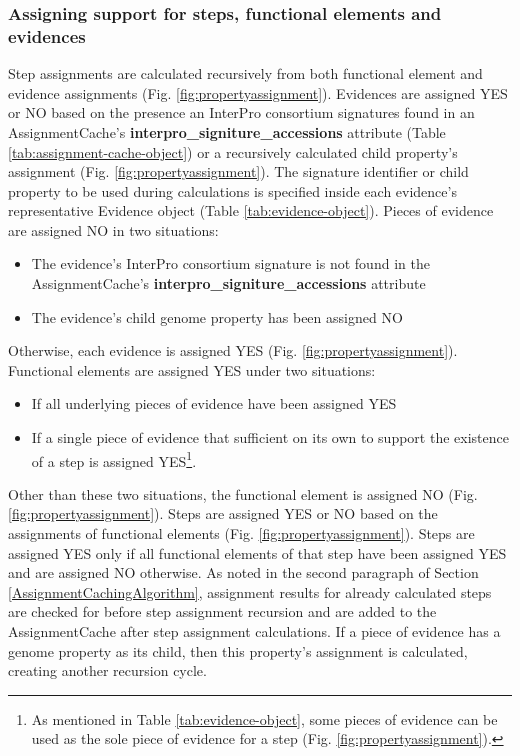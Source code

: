 \subsubsection{Assigning support for steps, functional elements and evidences}

Step assignments are calculated recursively from both functional element and 
evidence assignments (Fig. \ref{fig:propertyassignment}). Evidences are assigned 
YES or NO based on the presence an InterPro consortium signatures found in an 
AssignmentCache's \textbf{interpro\_signiture\_accessions} attribute (Table 
\ref{tab:assignment-cache-object}) or a recursively calculated child property's 
assignment (Fig. \ref{fig:propertyassignment}). The signature identifier or 
child property to be used during calculations is specified inside each 
evidence's representative Evidence object (Table \ref{tab:evidence-object}). 
Pieces of evidence are assigned NO in two situations: 

\begin{itemize}
\item The evidence's InterPro consortium signature is not found in the 
AssignmentCache's \textbf{interpro\_signiture\_accessions} attribute 
\item The evidence's child genome property has been assigned NO 
\end{itemize}
Otherwise, each evidence is assigned YES (Fig. \ref{fig:propertyassignment}). 
Functional elements are assigned YES under two situations: 

\begin{itemize}
\item If all underlying pieces of evidence have been assigned YES
\item If a single piece of evidence that sufficient on its own to support the 
existence of a step is assigned YES\footnote{As mentioned in Table 
\ref{tab:evidence-object}, some pieces of evidence can be used as the sole piece 
of evidence for a step (Fig. \ref{fig:propertyassignment}).}.
\end{itemize}

Other than these two situations, the functional element is assigned NO (Fig. 
\ref{fig:propertyassignment}). Steps are assigned YES or NO based on the 
assignments of functional elements (Fig. \ref{fig:propertyassignment}). Steps 
are assigned YES only if all functional elements of that step have been assigned 
YES and are assigned NO otherwise. As noted in the second paragraph of Section 
\ref{AssignmentCachingAlgorithm}, assignment results for already calculated 
steps are checked for before step assignment recursion and are added to the 
AssignmentCache after step assignment calculations. If a piece of evidence has a 
genome property as its child, then this property's assignment is calculated, 
creating another recursion cycle.

